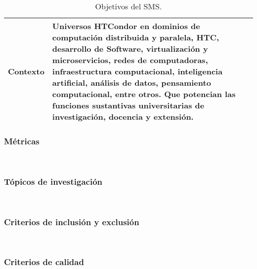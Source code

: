 \begin{table}[htbp]
\begin{tabular}{|>{\arraybackslash}m{1.7cm}|>{\arraybackslash}m{6.3cm}|}
		Contexto & Universos HTCondor en dominios de computación distribuida y paralela, HTC, desarrollo de Software, virtualización y microservicios, redes de computadoras, infraestructura computacional, inteligencia artificial, análisis de datos, pensamiento computacional, entre otros. Que potencian las funciones sustantivas universitarias de investigación, docencia y extensión.\\
		\hline
	\end{tabular}
	\vspace{6pt}  %
	\caption{Objetivos del SMS.}
	\label{table:PICOC}
	
\end{table}

\subsubsection{Métricas}
\mbox{}\\

\subsubsection{Tópicos de investigación}
\mbox{}\\

\subsubsection{Criterios de inclusión y exclusión}
\mbox{}\\

\subsubsection{Criterios de calidad}
\mbox{}\\
